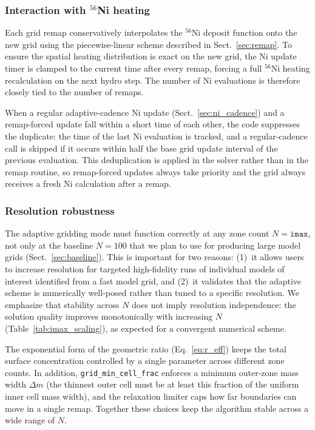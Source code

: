 \documentclass[twocolumn,linenumbers]{aastex701}
\begin{document}
\subsubsection{Interaction with $^{56}$Ni heating}
\label{sec:ni_remap_interaction}

Each grid remap conservatively interpolates the $^{56}$Ni deposit function onto the new grid using the piecewise-linear scheme described in Sect.~\ref{sec:remap}. To ensure the spatial heating distribution is exact on the new grid, the Ni update timer is clamped to the current time after every remap, forcing a full $^{56}$Ni heating recalculation on the next hydro step. The number of Ni evaluations is therefore closely tied to the number of remaps.

When a regular adaptive-cadence Ni update (Sect.~\ref{sec:ni_cadence}) and a remap-forced update fall within a short time of each other, the code suppresses the duplicate: the time of the last Ni evaluation is tracked, and a regular-cadence call is skipped if it occurs within half the base grid update interval of the previous evaluation. This deduplication is applied in the solver rather than in the remap routine, so remap-forced updates always take priority and the grid always receives a fresh Ni calculation after a remap.

\subsubsection{Resolution robustness}
\label{sec:imax_scaling}

The adaptive gridding mode must function correctly at any zone count $N = \texttt{imax}$, not only at the baseline $N=100$ that we plan to use for producing large model grids (Sect.~\ref{sec:baseline}). This is important for two reasons: (1)~it allows users to increase resolution for targeted high-fidelity runs of individual models of interest identified from a fast model grid, and (2)~it validates that the adaptive scheme is numerically well-posed rather than tuned to a specific resolution. We emphasize that stability across $N$ does not imply resolution independence: the solution quality improves monotonically with increasing $N$ (Table~\ref{tab:imax_scaling}), as expected for a convergent numerical scheme.

The exponential form of the geometric ratio (Eq.~\ref{eq:r_eff}) keeps the total surface concentration controlled by a single parameter across different zone counts. In addition, \texttt{grid\_min\_cell\_\-frac} enforces a minimum outer-zone mass width $\Delta m$ (the thinnest outer cell must be at least this fraction of the uniform inner cell mass width), and the relaxation limiter caps how far boundaries can move in a single remap. Together these choices keep the algorithm stable across a wide range of $N$.
\end{document}
